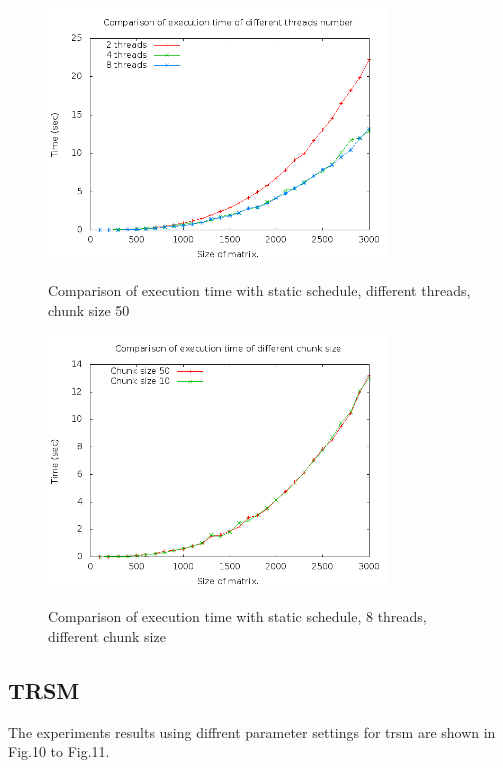 \documentclass{article}
\begin{document}
    \begin{figure}[th!]
        \centering
        \includegraphics[width=0.8\textwidth]{static_ck50.png}
        \label{fig:8}
        \caption{Comparison of execution time with static schedule, different threads, chunk size 50}
    \end{figure}

    \begin{figure}[th!]
        \centering
        \includegraphics[width=0.8\textwidth]{static_8.png}
        \label{fig:9}
        \caption{Comparison of execution time with static schedule, 8 threads, different chunk size}
    \end{figure}

\newpage
\subsection{TRSM}
The experiments results using diffrent parameter settings for trsm are shown in Fig.10 to Fig.11.
\end{document}
